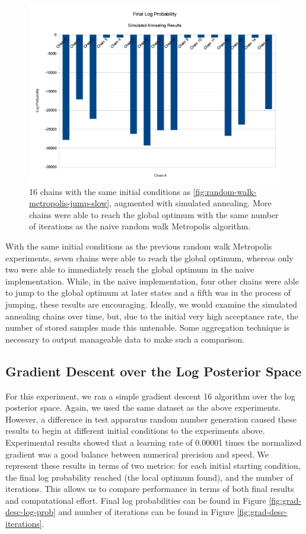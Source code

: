 \documentclass[runningheads]{llncs}
\begin{document}
\begin{figure}[t]
\begin{center}
   \includegraphics[width=0.8\linewidth]{figs/simulated-annealing.png}
\end{center}
   \caption{16 chains with the same initial conditions as 
        \ref{fig:random-walk-metropolis-jump-slow}, augmented with simulated 
        annealing. More chains were able to reach the global optimum with the 
        same number of iterations as the naive random walk Metropolis 
        algorithm.}
\label{fig:simulated-annealing}
\end{figure}

With the same initial conditions as the previous random walk Metropolis 
experiments, seven chains were able to reach the global optimum, whereas only 
two were able to immediately reach the global optimum in the naive 
implementation. While, in the naive implementation, four other chains were able 
to jump to the global optimum at later states and a fifth was in the process of 
jumping, these results are encouraging. Ideally, we would examine the simulated 
annealing chains over time, but, due to the initial very high acceptance rate, 
the number of stored samples made this untenable. Some aggregation technique is 
necessary to output manageable data to make such a comparison.

\subsection{Gradient Descent over the Log Posterior Space}

For this experiment, we ran a simple gradient descent 16 algorithm over the 
log posterior space. Again, we used the same dataset as the above experiments. 
However, a difference in test apparatus random number generation caused these 
results to begin at different initial conditions to the experiments above.
Experimental results showed that a learning rate of 0.00001 times the normalized 
gradient was a good balance between numerical precision and speed. We represent 
these results in terms of two metrics: for each initial starting condition, the 
final log probability reached (the local optimum found), and the number of 
iterations. This allows us to compare performance in terms of both final results 
and computational effort. Final log probabilities can be found in Figure \ref{fig:grad-desc-log-prob} 
and number of iterations can be found in Figure \ref{fig:grad-desc-iterations}.
\end{document}
